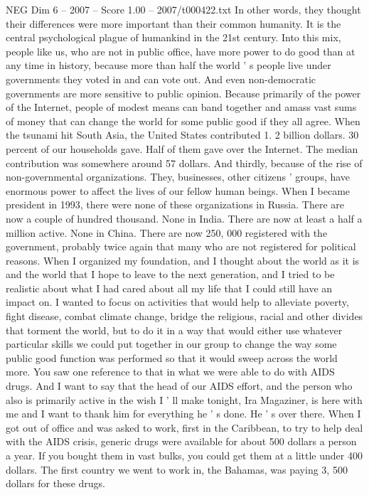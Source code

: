 \begin{textsample}{NEG Dim 6 – 2007 – Score 1.00 – 2007/t000422.txt}
In other words, they thought their differences were more important than their common humanity.
It is the central psychological plague of humankind in the 21st century.
Into this mix, people like us, who are not in public office, have more power to do good than at any time in history, because more than half the world ' s people live under governments they voted in and can vote out.
And even non-democratic governments are more sensitive to public opinion.
Because primarily of the power of the Internet, people of modest means can band together and amass vast sums of money that can change the world for some public good if they all agree.
When the tsunami hit South Asia, the United States contributed 1. 2 billion dollars. 30 percent of our households gave.
Half of them gave over the Internet.
The median contribution was somewhere around 57 dollars.
And thirdly, because of the rise of non-governmental organizations.
They, businesses, other citizens ' groups, have enormous power to affect the lives of our fellow human beings.
When I became president in 1993, there were none of these organizations in Russia.
There are now a couple of hundred thousand.
None in India.
There are now at least a half a million active.
None in China.
There are now 250, 000 registered with the government, probably twice again that many who are not registered for political reasons.
When I organized my foundation, and I thought about the world as it is and the world that I hope to leave to the next generation, and I tried to be realistic about what I had cared about all my life that I could still have an impact on.
I wanted to focus on activities that would help to alleviate poverty, fight disease, combat climate change, bridge the religious, racial and other divides that torment the world, but to do it in a way that would either use whatever particular skills we could put together in our group to change the way some public good function was performed so that it would sweep across the world more.
You saw one reference to that in what we were able to do with AIDS drugs.
And I want to say that the head of our AIDS effort, and the person who also is primarily active in the wish I ' ll make tonight, Ira Magaziner, is here with me and I want to thank him for everything he ' s done.
He ' s over there.
When I got out of office and was asked to work, first in the Caribbean, to try to help deal with the AIDS crisis, generic drugs were available for about 500 dollars a person a year.
If you bought them in vast bulks, you could get them at a little under 400 dollars.
The first country we went to work in, the Bahamas, was paying 3, 500 dollars for these drugs.

\end{textsample}
